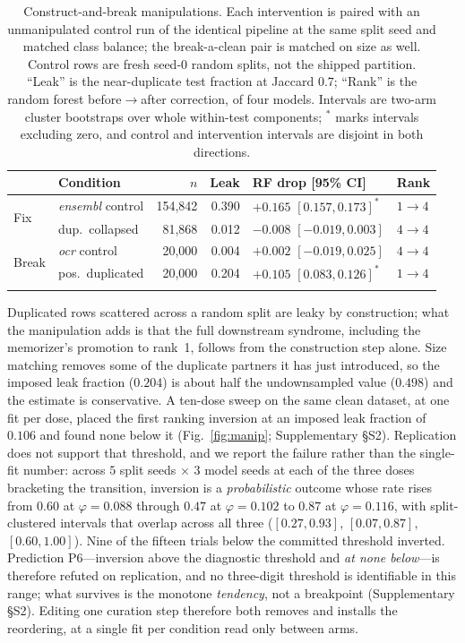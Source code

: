 \documentclass[webpdf,modern,large,namedate]{oup-authoring-template}%
\begin{document}
\begin{table}[tbp]
\begin{center}
\caption{Construct-and-break manipulations. Each intervention is paired with an unmanipulated control run of the identical pipeline at the same split seed and matched class balance; the break-a-clean pair is matched on size as well. Control rows are fresh seed-$0$ random splits, not the shipped partition. ``Leak'' is the near-duplicate test fraction at Jaccard $0.7$; ``Rank'' is the random forest before$\to$after correction, of four models. Intervals are two-arm cluster bootstraps over whole within-test components; $^{*}$ marks intervals excluding zero, and control and intervention intervals are disjoint in both directions.\label{tab:manip}}
\footnotesize\setlength{\tabcolsep}{1.5pt}\begin{tabular}{@{}llrrll@{}}
\toprule
& Condition & $n$ & Leak & RF drop [95\% CI] & Rank\\
\midrule
\multirow{2}{*}{Fix} & \textit{ensembl} control & 154{,}842 & 0.390 & $+0.165$ $[0.157,0.173]^{*}$ & $1\!\to\!4$\\
& \quad dup.\ collapsed & 81{,}868 & 0.012 & $-0.008$ $[-0.019,0.003]$ & $4\!\to\!4$\\
\midrule
\multirow{2}{*}{Break} & \textit{ocr} control & 20{,}000 & 0.004 & $+0.002$ $[-0.019,0.025]$ & $4\!\to\!4$\\
& \quad pos.\ duplicated & 20{,}000 & 0.204 & $+0.105$ $[0.083,0.126]^{*}$ & $1\!\to\!4$\\
\botrule
\end{tabular}
\end{center}
\end{table}

Duplicated rows scattered across a random split are leaky by construction; what the manipulation adds is that the full downstream syndrome, including the memorizer's promotion to rank~1, follows from the construction step alone. Size matching removes some of the duplicate partners it has just introduced, so the imposed leak fraction ($0.204$) is about half the undownsampled value ($0.498$) and the estimate is conservative. A ten-dose sweep on the same clean dataset, at one fit per dose, placed the first ranking inversion at an imposed leak fraction of $0.106$ and found none below it (Fig.~\ref{fig:manip}; Supplementary \S S2). Replication does not support that threshold, and we report the failure rather than the single-fit number: across $5$ split seeds $\times$ $3$ model seeds at each of the three doses bracketing the transition, inversion is a \emph{probabilistic} outcome whose rate rises from $0.60$ at $\varphi=0.088$ through $0.47$ at $\varphi=0.102$ to $0.87$ at $\varphi=0.116$, with split-clustered intervals that overlap across all three ($[0.27,0.93]$, $[0.07,0.87]$, $[0.60,1.00]$). Nine of the fifteen trials below the committed threshold inverted. Prediction P6---inversion above the diagnostic threshold and \emph{at none below}---is therefore refuted on replication, and no three-digit threshold is identifiable in this range; what survives is the monotone \emph{tendency}, not a breakpoint (Supplementary \S S2). Editing one curation step therefore both removes and installs the reordering, at a single fit per condition read only between arms.
\end{document}
